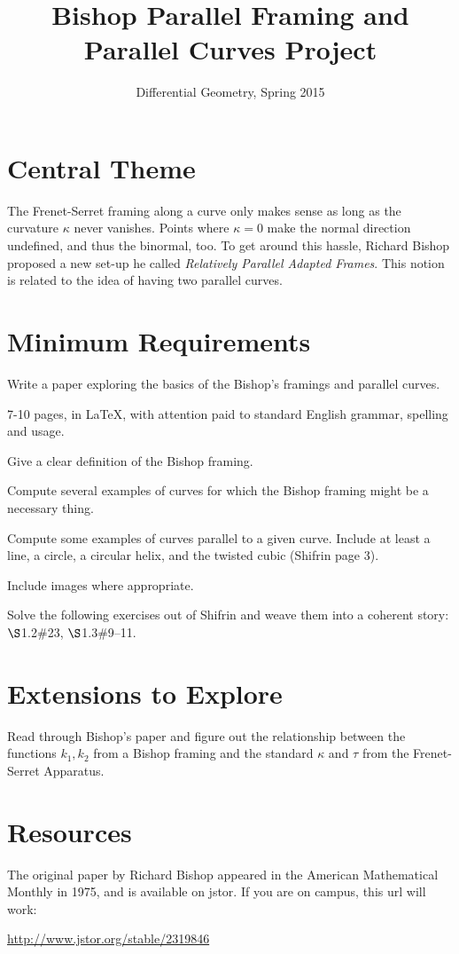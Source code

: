 \documentclass[12pt]{amsart}
\begin{document}
\title{Bishop Parallel Framing and Parallel Curves Project}
\author{Differential Geometry, Spring 2015}

\maketitle

\section*{Central Theme}

The Frenet-Serret framing along a curve only makes sense as long as the curvature $\kappa$ never vanishes. Points where $\kappa = 0$ make the normal direction undefined, and thus the binormal, too. To get around this hassle, Richard Bishop proposed a new set-up he called \emph{Relatively Parallel Adapted Frames}. This notion is related to the idea of having two parallel curves.

\section*{Minimum Requirements}

Write a paper exploring the basics of the Bishop's framings and parallel curves. 
\begin{compactitem}
\item 7-10 pages, in \LaTeX, with attention paid to standard English grammar, spelling and usage.
\item Give a clear definition of the Bishop framing.
\item Compute several examples of curves for which the Bishop framing might be a necessary thing.
\item Compute some examples of curves parallel to a given curve. Include at least a line, a circle, a circular helix, and the twisted cubic (Shifrin page 3).
\item Include images where appropriate.
\item Solve the following exercises out of Shifrin and weave them into a coherent story: $\S$1.2\#23, $\S$1.3\#9--11.
\end{compactitem}


\section*{Extensions to Explore}

Read through Bishop's paper and figure out the relationship between the functions $k_1, k_2$ from a Bishop framing and the standard $\kappa$ and $\tau$ from the Frenet-Serret Apparatus.
\section*{Resources}

The original paper by Richard Bishop appeared in the American Mathematical Monthly in 1975, and is available on jstor. If you are on campus, this url will work:

\url{http://www.jstor.org/stable/2319846}
\end{document}
